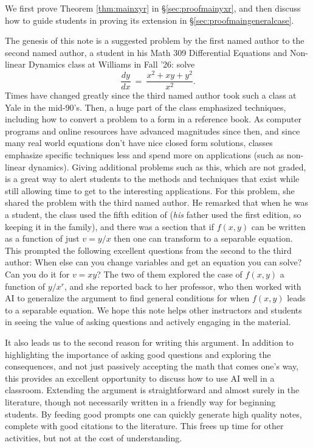 \documentclass[12pt,reqno]{amsart}
\theoremstyle{plain}
\numberwithin{equation}{section} %
\numberwithin{table}{section} %
\numberwithin{figure}{section}
\begin{document}
We first prove Theorem \ref{thm:mainxyr} in \S\ref{sec:proofmainyxr}, and then discuss how to guide students in proving its extension in \S\ref{sec:proofmaingeneralcase}.

The genesis of this note is a suggested problem by the first named author to the second named author, a student in his Math 309 Differential Equations and Non-linear Dynamics class at Williams in Fall '26: solve \begin{equation} \frac{dy}{dx} \ = \ \frac{x^2 + xy + y^2}{x^2}. \end{equation} Times have changed greatly since the third named author took such a class at Yale in the mid-90's. Then, a huge part of the class emphasized techniques, including how to convert a problem to a form in a reference book. As computer programs and online resources have advanced magnitudes since then, and since many real world equations don't have nice closed form solutions, classes emphasize specific techniques less and spend more on applications (such as non-linear dynamics). Giving additional problems such as this, which are not graded, is a great way to alert students to the methods and techniques that exist while still allowing time to get to the interesting applications. For this problem, she shared the problem with the third named author. He remarked that when he was a student, the class used the fifth edition of \cite{BoDi} (\emph{his} father used the first edition, so keeping it in the family), and there was a section that if $f(x,y)$ can be written as a function of just $v = y/x$ then one can transform to a separable equation. This prompted the following excellent questions from the second to the third author: When else can you change variables and get an equation you can solve? Can you do it for $v = xy$? The two of them explored the case of $f(x,y)$ a function of $y/x^r$, and she reported back to her professor, who then worked with AI to generalize the argument to find general conditions for when $f(x,y)$ leads to a separable equation. We hope this note helps other instructors and students in seeing the value of asking questions and actively engaging in the material.

It also leads us to the second reason for writing this argument. In addition to highlighting the importance of asking good questions and exploring the consequences, and not just passively accepting the math that comes one's way, this provides an excellent opportunity to discuss how to use AI well in a classroom. Extending the argument is straightforward and almost surely in the literature, though not necessarily written in a friendly way for beginning students. By feeding good prompts one can quickly generate high quality notes, complete with good citations to the literature. This frees up time for other activities, but not at the cost of understanding.
\end{document}
